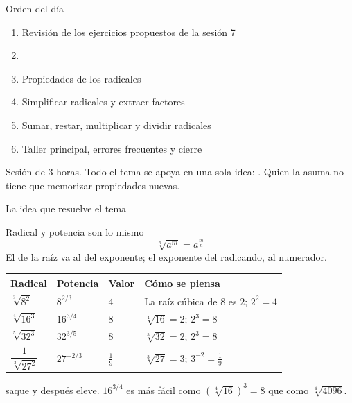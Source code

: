 \documentclass[aspectratio=169,10pt]{beamer}
\begin{document}
\portada

\begin{frame}{Orden del día}
  \begin{enumerate}
    \item Revisión de los ejercicios propuestos de la sesión 7
    \item {}
    \item Propiedades de los radicales
    \item Simplificar radicales y extraer factores
    \item Sumar, restar, multiplicar y dividir radicales
    \item Taller principal, errores frecuentes y cierre
  \end{enumerate}

  \vspace{0.25cm}
  {\footnotesize\color{uniGris} Sesión de 3 horas. Todo el tema se apoya en una
  sola idea: .
  Quien la asuma no tiene que memorizar propiedades nuevas.}
\end{frame}


\begin{frame}{La idea que resuelve el tema}
  \scriptsize
  \begin{block}{Radical y potencia son lo mismo}
    \scriptsize
    \[ \sqrt[n]{a^{m}} = a^{\frac{m}{n}} \]
    El  de la raíz va al  del exponente; el
    exponente del radicando, al numerador.
  \end{block}

  \vspace{0.1cm}
  \begin{center}
  \begin{tabular}{@{}llll@{}}
    \toprule
    \textbf{Radical} & \textbf{Potencia} & \textbf{Valor} &
    \textbf{Cómo se piensa} \\
    \midrule
    $\sqrt[3]{8^{2}}$ & $8^{2/3}$ & $4$ &
      La raíz cúbica de $8$ es $2$; $2^{2}=4$ \\
    $\sqrt[4]{16^{3}}$ & $16^{3/4}$ & $8$ &
      $\sqrt[4]{16}=2$; $2^{3}=8$ \\
    $\sqrt[5]{32^{3}}$ & $32^{3/5}$ & $8$ &
      $\sqrt[5]{32}=2$; $2^{3}=8$ \\
    $\dfrac{1}{\sqrt[3]{27^{2}}}$ & $27^{-2/3}$ & $\tfrac{1}{9}$ &
      $\sqrt[3]{27}=3$; $3^{-2}=\tfrac{1}{9}$ \\
    \bottomrule
  \end{tabular}
  \end{center}

  \vspace{0.08cm}
  {\tiny\color{uniGris}  saque  y después eleve. $16^{3/4}$ es más fácil como $(\sqrt[4]{16})^{3}=8$
  que como $\sqrt[4]{4096}$.}
\end{frame}
\end{document}
